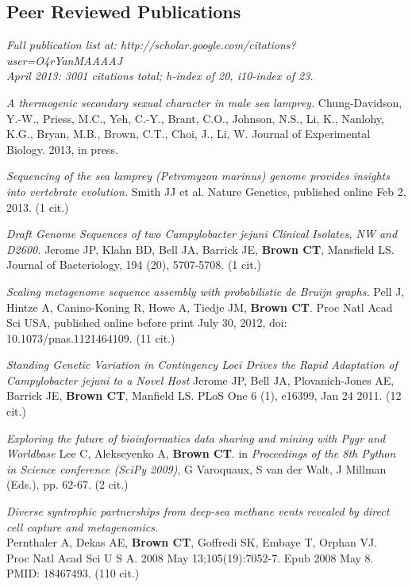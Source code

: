 \documentclass[margin,line]{resume}
\begin{document}
\begin{resume}
    \section{\mysidestyle Peer Reviewed Publications}

{\em Full publication list at: http://scholar.google.com/citations?user=O4rYanMAAAAJ\\
April 2013: 3001 citations total; h-index of 20, i10-index of 23.}

{\em A thermogenic secondary sexual character in male sea lamprey.} 
Chung-Davidson, Y.-W., Priess, M.C., Yeh, C.-Y., Brant, C.O., Johnson, N.S.,
Li, K., Nanlohy, K.G., Bryan, M.B., Brown, C.T., Choi, J., Li, W. Journal of Experimental Biology. 2013, in press.

{\em Sequencing of the sea lamprey (Petromyzon marinus) genome provides insights into vertebrate evolution.} Smith JJ et al. Nature Genetics, published online Feb 2, 2013. (1 cit.)

{\em Draft Genome Sequences of two Campylobacter jejuni Clinical Isolates,
NW and D2600.} Jerome JP, Klahn BD, Bell JA, Barrick JE, {\bf Brown CT}, Mansfield LS. Journal of Bacteriology, 194 (20), 5707-5708. (1 cit.)

{\em Scaling metagenome sequence assembly with probabilistic de Bruijn
graphs.} Pell J, Hintze A, Canino-Koning R, Howe A, Tiedje JM, {\bf Brown
  CT}. Proc Natl Acad Sci USA, published online before print July 30,
  2012, doi: 10.1073/pnas.1121464109. (11 cit.)

{\em Standing Genetic Variation in Contingency Loci Drives the Rapid
  Adaptation of Campylobacter jejuni to a Novel Host} Jerome JP, Bell
JA, Plovanich-Jones AE, Barrick JE, {\bf Brown CT}, Manfield LS.  PLoS One 6
(1), e16399, Jan 24 2011. (12 cit.)

{\em Exploring the future of bioinformatics data sharing and mining
  with Pygr and Worldbase} Lee C, Alekseyenko A, {\bf Brown CT}.  in {\em
  Proceedings of the 8th Python in Science conference (SciPy 2009)}, G
Varoquaux, S van der Walt, J Millman (Eds.), pp. 62-67.  (2 cit.)

{\em Diverse syntrophic partnerships from deep-sea methane vents revealed by direct cell capture and metagenomics.}\\
Pernthaler A, Dekas AE, {\bf Brown CT}, Goffredi SK, Embaye T, Orphan VJ.\\
Proc Natl Acad Sci U S A. 2008 May
13;105(19):7052-7. Epub 2008 May 8.  PMID: 18467493.  (110 cit.)


\end{resume}
\end{document}
